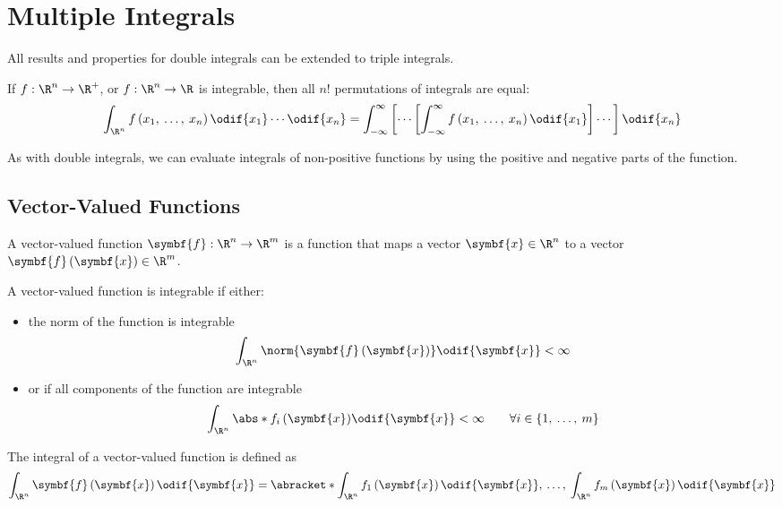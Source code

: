 \documentclass{article}
\begin{document}
\section{Multiple Integrals}
All results and properties for double integrals can be extended to
triple integrals.
\begin{theorem}
    If \(f : \R^n \to \R^+\), or \(f : \R^n \to \R\) is integrable, then
    all \(n! \) permutations of integrals are equal:
    \begin{equation*}
        \int_{\R^n} f\left( x_1,\: \ldots,\: x_n \right) \odif{x_1} \cdots \odif{x_n} = \int_{-\infty}^\infty \left[ \cdots \left[ \int_{-\infty}^\infty f\left( x_1,\: \ldots,\: x_n \right) \odif{x_1} \right] \cdots \right] \odif{x_n}
    \end{equation*}
\end{theorem}
As with double integrals, we can evaluate integrals of non-positive
functions by using the positive and negative parts of the function.
\subsection{Vector-Valued Functions}
\begin{definition}
    A vector-valued function \(\symbf{f} : \R^n \to \R^m\) is a
    function that maps a vector \(\symbf{x} \in \R^n\) to a vector
    \(\symbf{f}\left( \symbf{x} \right) \in \R^m\).
\end{definition}
A vector-valued function is integrable if either:
\begin{itemize}
    \item the norm of the function is integrable
          \begin{equation*}
              \int_{\R^n} \norm{\symbf{f}\left( \symbf{x} \right)} \odif{\symbf{x}} < \infty
          \end{equation*}
    \item or if all components of the function are integrable
          \begin{equation*}
              \int_{\R^n} \abs*{f_i\left( \symbf{x} \right)} \odif{\symbf{x}} < \infty \qquad \forall i \in \left\{ 1,\: \ldots,\: m \right\}
          \end{equation*}
\end{itemize}
The integral of a vector-valued function is defined as
\begin{equation*}
    \int_{\R^n} \symbf{f}\left( \symbf{x} \right) \odif{\symbf{x}} = \abracket*{\int_{\R^n} f_1\left( \symbf{x} \right) \odif{\symbf{x}},\: \ldots,\: \int_{\R^n} f_m\left( \symbf{x} \right) \odif{\symbf{x}}}
\end{equation*}
\end{document}
